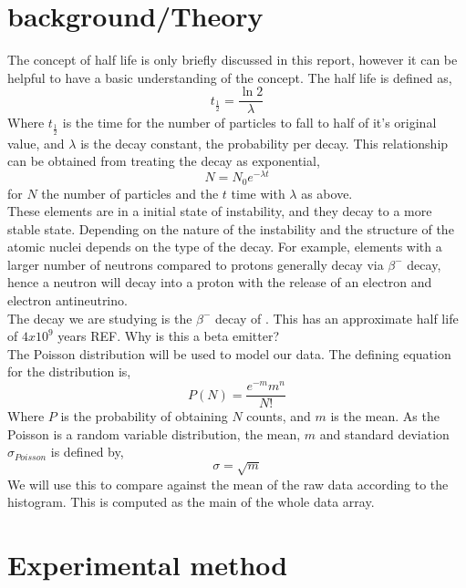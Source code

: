 \documentclass[11pt]{article}
\begin{document}
    \section{background/Theory}
    The concept of half life is only briefly discussed in this report, however it can be helpful to have a basic understanding of the concept. The half life is defined as,
    \begin{equation}
        t_{\frac{1}{2}} = \frac{\ln{2}}{\lambda}
    \end{equation}
    Where $ t_{\frac{1}{2}}$ is the time for the number of particles to fall to half of it's original value, and $\lambda$ is the decay constant, the probability per decay. This relationship can be obtained from treating the decay as exponential, 
    $$N = N_0 e^{-\lambda t}$$
    for $N$ the number of particles and the $t$ time with $\lambda$ as above. 
   \\
   These elements are in a initial state of instability, and they decay to a more stable state. Depending on the nature of the instability and the structure of the atomic nuclei depends on the type of the decay. For example, elements with a larger number of neutrons compared to protons generally decay via $\beta^{-}$ decay, hence a neutron will decay into a proton with the release of an electron and electron antineutrino. 
   \\
   The decay we are studying is the $\beta^{-}$ decay of . This has an approximate half life of $4 x 10^9$ years REF. Why is this a beta emitter?
   \\
    The Poisson distribution will be used to model our data. The defining equation for the distribution is, 
    \begin{equation}
        P(N) = \frac{e^{-m}m^{n}}{N!}
    \end{equation}
    Where $P$ is the probability of obtaining $N$ counts, and $m$ is the mean.
    As the Poisson is a random variable distribution, the mean, $m$ and standard deviation $\sigma_{Poisson}$ is defined by,
    \begin{equation}
        \sigma = \sqrt{m}
    \end{equation}
    We will use this to compare against the mean of the raw data according to the histogram. This is computed as the main of the whole data array. 
     \newline 
    \section{Experimental method}
\end{document}
